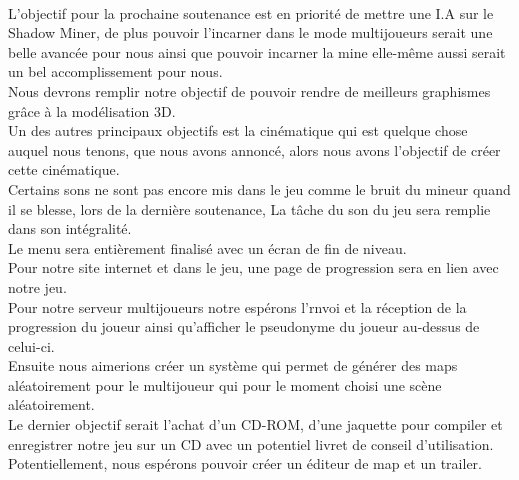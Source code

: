 \documentclass[titlepage, 13px, a4paper]{report}
\begin{document}
\paragraph{} \hspace{0pt} 
L'objectif pour la prochaine soutenance est en priorité de mettre une I.A sur le Shadow Miner, de plus pouvoir l'incarner 
dans le mode multijoueurs serait une belle avancée pour nous ainsi que pouvoir incarner la mine elle-même aussi serait 
un bel accomplissement pour nous. \\

Nous devrons remplir notre objectif de pouvoir rendre de meilleurs graphismes grâce à la modélisation 3D. \\

Un des autres principaux objectifs est la cinématique qui est quelque chose auquel nous tenons, que nous avons annoncé, 
alors nous avons l'objectif de créer cette cinématique. \\

Certains sons ne sont pas encore mis dans le jeu comme le bruit du mineur quand il se blesse, lors de la dernière soutenance, 
La tâche du son du jeu sera remplie dans son intégralité. \\

Le menu sera entièrement finalisé avec un écran de fin de niveau. \\

Pour notre site internet et dans le jeu, une page de progression sera en lien avec notre jeu. \\

Pour notre serveur multijoueurs notre espérons l'rnvoi et la réception de la progression du joueur ainsi qu’afficher 
le pseudonyme du joueur au-dessus de celui-ci. \\

Ensuite nous aimerions créer un système qui permet de générer des maps aléatoirement pour le multijoueur qui pour 
le moment choisi une scène aléatoirement. \\

Le dernier objectif serait l'achat d'un CD-ROM, d'une jaquette pour compiler et enregistrer notre jeu sur un CD avec 
un potentiel livret de conseil d'utilisation. \\

Potentiellement, nous espérons pouvoir créer un éditeur de map et un trailer. \\
\end{document}
